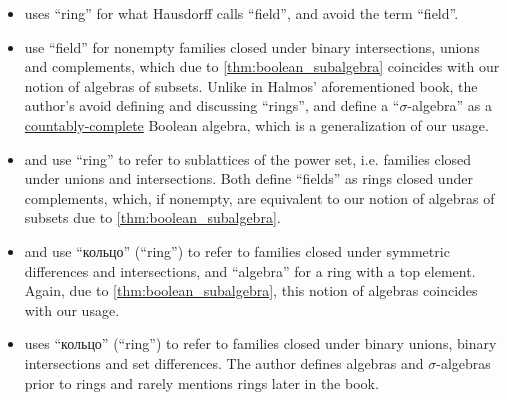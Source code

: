 \begin{remark}
\begin{itemize}
    \item \Textcite[20]{Halmos1976MeasureTheory} uses \enquote{ring} for what Hausdorff calls \enquote{field}, and avoid the term \enquote{field}.

    \item \Textcite[268]{HalmosGivant2009BooleanAlgebras} use \enquote{field} for nonempty families closed under binary intersections, unions and complements, which due to \cref{thm:boolean_subalgebra} coincides with our notion of algebras of subsets. Unlike in Halmos' aforementioned book, the author's avoid defining and discussing \enquote{rings}, and define a \enquote{\( \sigma \)-algebra} as a \hyperref[def:countably_complete_lattice]{countably-complete} Boolean algebra, which is a generalization of our usage.

    \item \Textcite[12]{Birkhoff1967LatticeTheory} and \textcite[113]{Grätzer2011LatticeTheory} use \enquote{ring} to refer to sublattices of the power set, i.e. families closed under unions and intersections. Both define \enquote{fields} as rings closed under complements, which, if nonempty, are equivalent to our notion of algebras of subsets due to \cref{thm:boolean_subalgebra}.

    \item \Textcite[def. I.5.1]{КолмогоровФомин2009ФункциональныйАнализ} and \textcite[def. 1.2]{ДьяченкоУльянов1998МераИИнтеграл} use \enquote{кольцо} (\enquote{ring}) to refer to families closed under symmetric differences and intersections, and \enquote{algebra} for a ring with a top element. Again, due to \cref{thm:boolean_subalgebra}, this notion of algebras coincides with our usage.

    \item \Textcite[def. 1.2.13]{Богачёв2003ОсновыТеорииМерыТом1} uses \enquote{кольцо} (\enquote{ring}) to refer to families closed under binary unions, binary intersections and set differences. The author defines algebras and \( \sigma \)-algebras prior to rings and rarely mentions rings later in the book.
  \end{itemize}
\end{remark}
